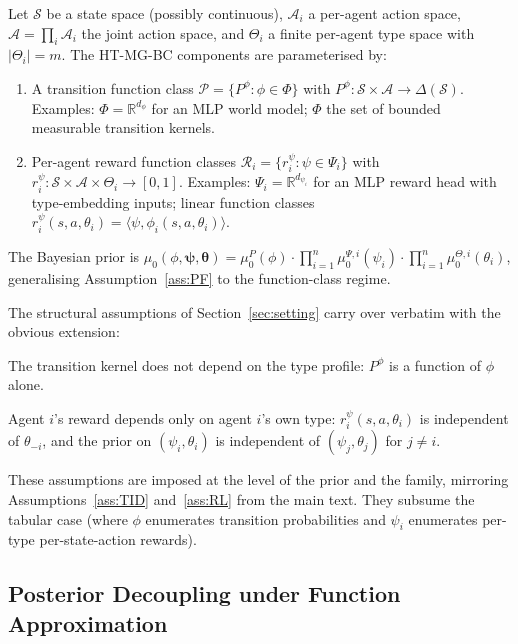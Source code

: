Let $\mathcal{S}$ be a state space (possibly continuous), $\mathcal{A}_i$ a per-agent action space, $\mathcal{A} = \prod_i \mathcal{A}_i$ the joint action space, and $\Theta_i$ a finite per-agent type space with $|\Theta_i| = m$. The HT-MG-BC components are parameterised by:
\begin{enumerate}
\item A transition function class $\mathcal{P} = \{P^\phi: \phi \in \Phi\}$ with $P^\phi: \mathcal{S} \times \mathcal{A} \to \Delta(\mathcal{S})$. Examples: $\Phi = \mathbb{R}^{d_\phi}$ for an MLP world model; $\Phi$ the set of bounded measurable transition kernels.
\item Per-agent reward function classes $\mathcal{R}_i = \{r_i^{\psi}: \psi \in \Psi_i\}$ with $r_i^\psi: \mathcal{S} \times \mathcal{A} \times \Theta_i \to [0, 1]$. Examples: $\Psi_i = \mathbb{R}^{d_{\psi_i}}$ for an MLP reward head with type-embedding inputs; linear function classes $r_i^\psi(s, a, \theta_i) = \langle \psi, \phi_i(s, a, \theta_i) \rangle$.
\end{enumerate}
The Bayesian prior is $\mu_0(\phi, \boldsymbol{\psi}, \boldsymbol{\theta}) = \mu_0^P(\phi) \cdot \prod_{i=1}^n \mu_0^{\Psi, i}(\psi_i) \cdot \prod_{i=1}^n \mu_0^{\Theta, i}(\theta_i)$, generalising Assumption~\ref{ass:PF} to the function-class regime.

The structural assumptions of Section~\ref{sec:setting} carry over verbatim with the obvious extension:

\begin{assumption}
\label{ass:tid-fa}
The transition kernel does not depend on the type profile: $P^\phi$ is a function of $\phi$ alone.
\end{assumption}

\begin{assumption}
\label{ass:otrl-fa}
Agent $i$'s reward depends only on agent $i$'s own type: $r_i^\psi(s, a, \theta_i)$ is independent of $\theta_{-i}$, and the prior on $(\psi_i, \theta_i)$ is independent of $(\psi_j, \theta_j)$ for $j \neq i$.
\end{assumption}

These assumptions are imposed at the level of the prior and the family, mirroring Assumptions~\ref{ass:TID} and~\ref{ass:RL} from the main text. They subsume the tabular case (where $\phi$ enumerates transition probabilities and $\psi_i$ enumerates per-type per-state-action rewards).

\subsection{Posterior Decoupling under Function Approximation}
\label{app:fa-decoupling}

